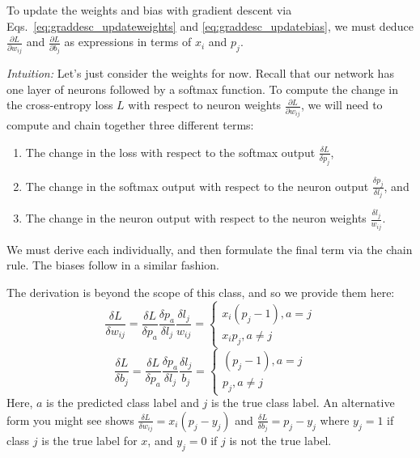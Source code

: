 To update the weights and bias with gradient descent via Eqs.~\ref{eq:graddesc_updateweights} and \ref{eq:graddesc_updatebias}, we must deduce $\frac{\partial L}{\partial w_{ij}}$ and $\frac{\partial L}{\partial b_j}$ as expressions in terms of $x_i$ and $p_j$.

\emph{Intuition:} Let's just consider the weights for now. Recall that our network has one layer of neurons followed by a softmax function. To compute the change in the cross-entropy loss $L$ with respect to neuron weights $\frac{\partial L}{\partial w_{ij}}$, we will need to compute and chain together three different terms:
\begin{enumerate}
\itemsep0em
\listparindent0em
\topsep0em
\parsep0em
\partopsep0em
\item The change in the loss with respect to the softmax output $\frac{\delta L}{\delta p_j}$,
\item The change in the softmax output with respect to the neuron output $\frac{\delta p_j}{\delta l_j}$, and
\item The change in the neuron output with respect to the neuron weights $\frac{\delta l_j}{w_{ij}}$.
\end{enumerate}
We must derive each individually, and then formulate the final term via the chain rule. The biases follow in a similar fashion.

The derivation is beyond the scope of this class, and so we provide them here:
\begin{equation}
\frac{\delta L}{\delta w_{ij}} = \frac{\delta L}{\delta p_a} \frac{\delta p_a}{\delta l_j} \frac{\delta l_j}{w_{ij}} =\begin{cases}
x_i(p_j-1), a = j\\
x_ip_j,  a\neq j
\end{cases}
\label{eq:wupdate}
\end{equation}
\begin{equation}
\frac{\delta L}{\delta b_j} = \frac{\delta L}{\delta p_a} \frac{\delta p_a}{\delta l_j} \frac{\delta l_j}{b_j} =\begin{cases}
(p_j-1), a = j\\
p_j,  a\neq j
\end{cases}
\label{eq:bupdate}
\end{equation}
Here, $a$ is the predicted class label and $j$ is the true class label. An alternative form you might see shows $\frac{\delta L}{\delta w_{ij}} = x_i(p_j-y_j)$ and $\frac{\delta L}{\delta b_j} = p_j-y_j$ where $y_j=1$ if class $j$ is the true label for $x$, and $y_j = 0$ if $j$ is not the true label.

